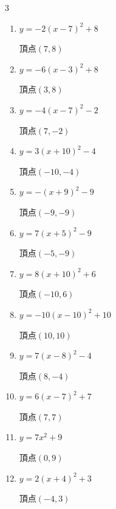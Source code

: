 \begin{multicols}{3}
\begin{enumerate}
  \item $\displaystyle y=-2\left( x-7\right)^{2}+8$

        $\displaystyle 頂点\left( 7 , 8 \right)$

  \item $\displaystyle y=-6\left( x-3\right)^{2}+8$

        $\displaystyle 頂点\left( 3 , 8 \right)$

  \item $\displaystyle y=-4\left( x-7\right)^{2}-2$

        $\displaystyle 頂点\left( 7 , -2 \right)$

  \item $\displaystyle y=3\left( x+10\right)^{2}-4$

        $\displaystyle 頂点\left( -10 , -4 \right)$

  \item $\displaystyle y=-\left( x+9\right)^{2}-9$

        $\displaystyle 頂点\left( -9 , -9 \right)$

  \item $\displaystyle y=7\left( x+5\right)^{2}-9$

        $\displaystyle 頂点\left( -5 , -9 \right)$

  \item $\displaystyle y=8\left( x+10\right)^{2}+6$

        $\displaystyle 頂点\left( -10 , 6 \right)$

  \item $\displaystyle y=-10\left( x-10\right)^{2}+10$

        $\displaystyle 頂点\left( 10 , 10 \right)$

  \item $\displaystyle y=7\left( x-8\right)^{2}-4$

        $\displaystyle 頂点\left( 8 , -4 \right)$

  \item $\displaystyle y=6\left( x-7\right)^{2}+7$

        $\displaystyle 頂点\left( 7 , 7 \right)$

  \item $\displaystyle y=7x^{2}+9$

        $\displaystyle 頂点\left( 0 , 9 \right)$

  \item $\displaystyle y=2\left( x+4\right)^{2}+3$

        $\displaystyle 頂点\left( -4 , 3 \right)$


\end{enumerate}
\end{multicols}
